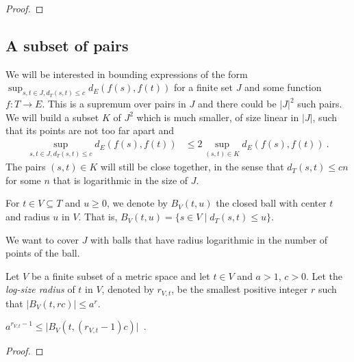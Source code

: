 \begin{proof}\leanok

\end{proof}


\subsection{A subset of pairs}

We will be interested in bounding expressions of the form $\sup_{s,t\in J, d_T(s,t) \le c} d_E(f(s), f(t))$ for a finite set $J$ and some function $f : T \to E$.
This is a supremum over pairs in $J$ and there could be $\vert J \vert^2$ such pairs.
We will build a subset $K$ of $J^2$ which is much smaller, of size linear in $\vert J \vert$, such that its points are not too far apart and
\begin{align*}
  \sup_{s,t\in J, d_T(s,t) \le c} d_E(f(s), f(t))
  & \le 2 \sup_{(s,t) \in K} d_E(f(s), f(t))
  \: .
\end{align*}
The pairs $(s, t) \in K$ will still be close together, in the sense that $d_T(s, t) \le c n$ for some $n$ that is logarithmic in the size of $J$.

For $t \in V \subseteq T$ and $u\ge 0$, we denote by $B_V(t, u)$ the closed ball with center $t$ and radius $u$ in $V$.
That is, $B_V(t, u) = \{s \in V \mid d_T(s, t) \le u\}$.

We want to cover $J$ with balls that have radius logarithmic in the number of points of the ball.

\begin{definition}\label{def:logSizeRadius}
  \mathlibok
Let $V$ be a finite subset of a metric space and let $t \in V$ and $a > 1$, $c > 0$.
Let the \emph{log-size radius} of $t$ in $V$, denoted by $r_{V,t}$, be the smallest positive integer $r$ such that $\vert B_V(t, r c) \vert \le a^{r}$.
\end{definition}


\begin{lemma}\label{lem:card_logSizeRadius_ge}
  \mathlibok
$a^{r_{V,t}-1} \le \vert B_V(t, (r_{V,t}-1)c) \vert$~.
\end{lemma}

\begin{proof}\leanok

\end{proof}


